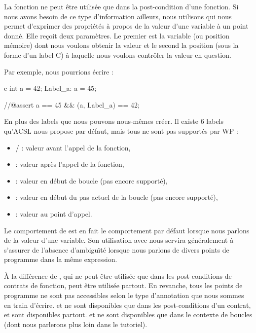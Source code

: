 \documentclass[middle]{zmdocument}
\begin{document}
La fonction  ne peut être utilisée que dans la post-condition d'une
fonction. Si nous avons besoin de ce type d'information ailleurs, nous 
utilisons  qui nous permet d'exprimer des propriétés à propos de la 
valeur d'une variable à un point donné. Elle reçoit deux paramètres. Le premier 
est la variable (ou position mémoire) dont nous voulons obtenir la valeur et le 
second la position (sous la forme d'un label C) à laquelle nous voulons 
contrôler la valeur en question.



Par exemple, nous pourrions écrire :



\begin{CodeBlock}{c}
  int a = 42;
 Label_a:
  a = 45;

  //@assert a == 45 && \at(a, Label_a) == 42;
\end{CodeBlock}



En plus des labels que nous pouvons nous-mêmes créer. Il existe 6 labels 
qu'ACSL nous propose par défaut, mais tous ne sont pas supportés par WP :



\begin{itemize}
\item {}/ : valeur avant l'appel de la fonction,
\item {} : valeur après l'appel de la fonction,
\item {} : valeur en début de boucle (pas encore supporté),
\item {} : valeur en début du pas actuel de la boucle (pas encore
supporté),
\item {} : valeur au point d'appel.
\end{itemize}


\begin{Information}
Le comportement de  est en fait le comportement par défaut lorsque
nous parlons de la valeur d'une variable. Son utilisation avec  nous 
servira généralement à s'assurer de l'absence d’ambiguïté lorsque nous parlons
de divers points de programme dans la même expression.
\end{Information}


À la différence de , qui ne peut être utilisée que dans les 
post-conditions de contrats de fonction,  peut être utilisée partout.
En revanche, tous les points de programme ne sont pas accessibles selon le type
d'annotation que nous sommes en train d'écrire.  et  ne sont 
disponibles que dans les post-conditions d'un contrat,  et 
sont disponibles partout.  et  ne sont 
disponibles que dans le contexte de boucles (dont nous parlerons plus loin dans
le tutoriel).
\end{document}
